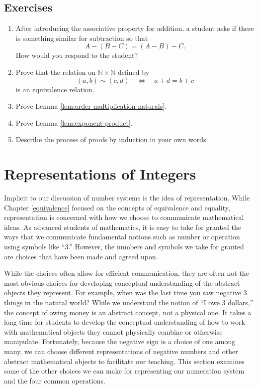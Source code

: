 \documentclass[
]{book}
\theoremstyle{definition}
\theoremstyle{definition}
\theoremstyle{definition}
\theoremstyle{definition}
\theoremstyle{remark}
\begin{document}
\hypertarget{exercises-9}{%
\subsection{Exercises}\label{exercises-9}}

\begin{enumerate}
\def\labelenumi{\arabic{enumi}.}
\item
  After introducing the associative property for addition, a student asks if there is something similar for subtraction so that
  \[ A-(B-C) = (A-B)-C.\] How would you respond to the student?
\item
  Prove that the relation on \(\mathbb{N}\times\mathbb{N}\) defined by \[(a,b)\sim (c,d) \quad \Leftrightarrow \quad a+d=b+c\] is an equivalence relation.
\item
  Prove Lemma \ref{lem:order-multiplication-naturals}.
\item
  Prove Lemma \ref{lem:exponent-product}.
\item
  Describe the process of proofs by induction in your own words.
\end{enumerate}

\hypertarget{integer-representation}{%
\section{Representations of Integers}\label{integer-representation}}

Implicit to our discussion of number systems is the idea of representation. While Chapter \ref{equivalence} focused on the concepts of equivalence and equality, representation is concerned with how we choose to communicate mathematical ideas. As advanced students of mathematics, it is easy to take for granted the ways that we communicate fundamental notions such as number or operation using symbols like ``3.'' However, the numbers and symbols we take for granted are choices that have been made and agreed upon.

While the choices often allow for efficient communication, they are often not the most obvious choices for developing conceptual understanding of the abstract objects they represent. For example, when was the last time you saw negative 3 things in the natural world? While we understand the notion of ``I owe 3 dollars,'' the concept of owing money is an abstract concept, not a physical one. It takes a long time for students to develop the conceptual understanding of how to work with mathematical objects they cannot physically combine or otherwise manipulate. Fortunately, because the negative sign is a choice of one among many, we can choose different representations of negative numbers and other abstract mathematical objects to facilitate our teaching. This section examines some of the other choices we can make for representing our numeration system and the four common operations.
\end{document}
